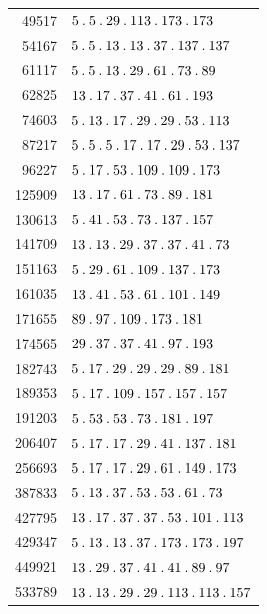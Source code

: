 %
\begingroup\small\setlength{\tabcolsep}{5pt}
\begin{longtable}{@{}r|l@{}}
49517 & $5\pdot 5\pdot 29\pdot 113\pdot 173\pdot 173$\\
54167 & $5\pdot 5\pdot 13\pdot 13\pdot 37\pdot 137\pdot 137$\\
61117 & $5\pdot 5\pdot 13\pdot 29\pdot 61\pdot 73\pdot 89$\\
62825 & $13\pdot 17\pdot 37\pdot 41\pdot 61\pdot 193$\\
74603 & $5\pdot 13\pdot 17\pdot 29\pdot 29\pdot 53\pdot 113$\\
87217 & $5\pdot 5\pdot 5\pdot 17\pdot 17\pdot 29\pdot 53\pdot 137$\\
96227 & $5\pdot 17\pdot 53\pdot 109\pdot 109\pdot 173$\\
125909 & $13\pdot 17\pdot 61\pdot 73\pdot 89\pdot 181$\\
130613 & $5\pdot 41\pdot 53\pdot 73\pdot 137\pdot 157$\\
141709 & $13\pdot 13\pdot 29\pdot 37\pdot 37\pdot 41\pdot 73$\\
151163 & $5\pdot 29\pdot 61\pdot 109\pdot 137\pdot 173$\\
161035 & $13\pdot 41\pdot 53\pdot 61\pdot 101\pdot 149$\\
171655 & $89\pdot 97\pdot 109\pdot 173\pdot 181$\\
174565 & $29\pdot 37\pdot 37\pdot 41\pdot 97\pdot 193$\\
182743 & $5\pdot 17\pdot 29\pdot 29\pdot 29\pdot 89\pdot 181$\\
189353 & $5\pdot 17\pdot 109\pdot 157\pdot 157\pdot 157$\\
191203 & $5\pdot 53\pdot 53\pdot 73\pdot 181\pdot 197$\\
206407 & $5\pdot 17\pdot 17\pdot 29\pdot 41\pdot 137\pdot 181$\\
256693 & $5\pdot 17\pdot 17\pdot 29\pdot 61\pdot 149\pdot 173$\\
387833 & $5\pdot 13\pdot 37\pdot 53\pdot 53\pdot 61\pdot 73$\\
427795 & $13\pdot 17\pdot 37\pdot 37\pdot 53\pdot 101\pdot 113$\\
429347 & $5\pdot 13\pdot 13\pdot 37\pdot 173\pdot 173\pdot 197$\\
449921 & $13\pdot 29\pdot 37\pdot 41\pdot 41\pdot 89\pdot 97$\\
533789 & $13\pdot 13\pdot 29\pdot 29\pdot 113\pdot 113\pdot 157$\\

\end{longtable}
